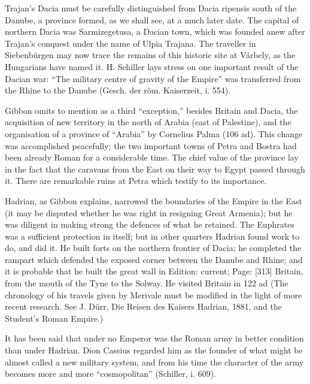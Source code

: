 Trajan\texthebrew{}’s Dacia must be carefully distinguished from Dacia ripensis south of the Danube, a province formed, as we shall see, at a much later date. The capital of northern Dacia was Sarmizegetusa, a Dacian town, which was founded anew after Trajan\texthebrew{}’s conquest under the name of Ulpia Trajana. The traveller in Siebenbürgen may now trace the remains of this historic site at Várbely, as the Hungarians have named it. H. Schiller lays stress on one important result of the Dacian war: \texthebrew{“}The military centre of gravity of the Empire\texthebrew{}” was transferred from the Rhine to the Danube (Gesch. der röm. Kaiserzeit, i. 554).

Gibbon omits to mention as a third \texthebrew{“}exception,\texthebrew{}” besides Britain and Dacia, the acquisition of new territory in the north of Arabia (east of Palestine), and the organisation of a province of \texthebrew{“}Arabia\texthebrew{}” by Cornelius Palma (106 ad). This change was accomplished peacefully; the two important towns of Petra and Bostra had been already Roman for a considerable time. The chief value of the province lay in the fact that the caravans from the East on their way to Egypt passed through it. There are remarkable ruins at Petra which testify to its importance.

Hadrian, as Gibbon explains, narrowed the boundaries of the Empire in the East (it may be disputed whether he was right in resigning Great Armenia); but he was diligent in making strong the defences of what he retained. The Euphrates was a sufficient protection in itself; but in other quarters Hadrian found work to do, and did it. He built forts on the northern frontier of Dacia; he completed the rampart which defended the exposed corner between the Danube and Rhine; and it is probable that he built the great wall in Edition: current; Page: [313] Britain, from the mouth of the Tyne to the Solway. He visited Britain in 122 ad (The chronology of his travels given by Merivale must be modified in the light of more recent research. See J. Dürr, Die Reisen des Kaisers Hadrian, 1881, and the Student\texthebrew{}’s Roman Empire.)

It has been said that under no Emperor was the Roman army in better condition than under Hadrian. Dion Cassius regarded him as the founder of what might be almost called a new military system, and from his time the character of the army becomes more and more \texthebrew{“}cosmopolitan\texthebrew{}” (Schiller, i. 609).


